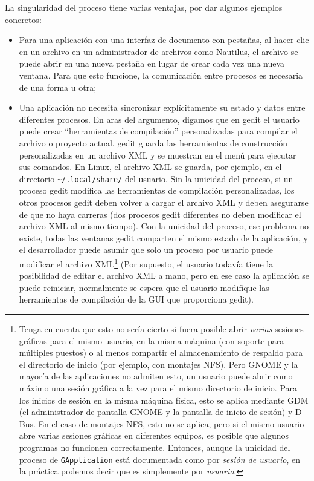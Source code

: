 La singularidad del proceso tiene varias ventajas, por dar algunos ejemplos concretos:
\begin{itemize}
  \item Para una aplicación con una interfaz de documento con pestañas, al hacer clic en un archivo en un administrador de archivos como Nautilus, el archivo se puede abrir en una nueva pestaña en lugar de crear cada vez una nueva ventana. Para que esto funcione, la comunicación entre procesos es necesaria de una forma u otra;
  \item Una aplicación no necesita sincronizar explícitamente su estado y datos entre diferentes procesos. En aras del argumento, digamos que en gedit el usuario puede crear ``herramientas de compilación'' personalizadas para compilar el archivo o proyecto actual. gedit guarda las herramientas de construcción personalizadas en un archivo XML y se muestran en el menú para ejecutar sus comandos. En Linux, el archivo XML se guarda, por ejemplo, en el directorio \texttt{\textasciitilde{}/.local/share/} del usuario. Sin la unicidad del proceso, si un proceso gedit modifica las herramientas de compilación personalizadas, los otros procesos gedit deben volver a cargar el archivo XML y deben asegurarse de que no haya carreras (dos procesos gedit diferentes no deben modificar el archivo XML al mismo tiempo). Con la unicidad del proceso, ese problema no existe, todas las ventanas gedit comparten el mismo estado de la aplicación, y el desarrollador puede asumir que solo un proceso por usuario puede modificar el archivo XML\footnote{Tenga en cuenta que esto no sería cierto si fuera posible abrir \emph{varias} sesiones gráficas para el mismo usuario, en la misma máquina (con soporte para múltiples puestos) o al menos compartir el almacenamiento de respaldo para el directorio de inicio (por ejemplo, con montajes NFS). Pero GNOME y la mayoría de las aplicaciones no admiten esto, un usuario puede abrir como máximo una sesión gráfica a la vez para el mismo directorio de inicio. Para los inicios de sesión en la misma máquina física, esto se aplica mediante GDM (el administrador de pantalla GNOME y la pantalla de inicio de sesión) y D-Bus. En el caso de montajes NFS, esto no se aplica, pero si el mismo usuario abre varias sesiones gráficas en diferentes equipos, es posible que algunos programas no funcionen correctamente. Entonces, aunque la unicidad del proceso de \lstinline{GApplication} está documentada como por \emph{sesión de usuario}, en la práctica podemos decir que es simplemente por \emph{usuario}.} (Por supuesto, el usuario todavía tiene la posibilidad de editar el archivo XML a mano, pero en ese caso la aplicación se puede reiniciar, normalmente se espera que el usuario modifique las herramientas de compilación de la GUI que proporciona gedit).
\end{itemize}


